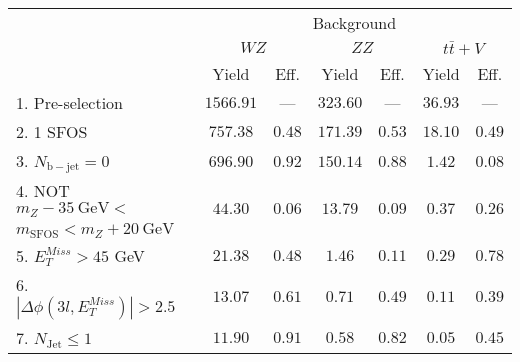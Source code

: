 \begin{tabular}{l||c|c||c|c||c|c}
\hline
 &       \multicolumn{6}{c}{Background}\\
 &  \multicolumn{2}{c||}{$WZ$} & \multicolumn{2}{c||}{$ZZ$} & \multicolumn{2}{c}{$t\bar{t}+V$} \\ 
 & Yield & Eff. & Yield & Eff. & Yield & Eff. \\
\hline\hline
1. Pre-selection & $1566.91$ & --- &  $323.60$ & --- &  $36.93$ & ---  \\
\hline
2. 1 SFOS &  $757.38$ &  $0.48$ &  $171.39$ &  $0.53$ &  $18.10$ &  $0.49$ \\ 
\hline
3. $N_{\mathrm{b-jet}} = 0$ &  $696.90$ &  $0.92$ &  $150.14$ &  $0.88$ &  $1.42$ &  $0.08$\\ 
\hline
4. NOT $m_Z - 35~\mathrm{GeV} <$  &  \multirow{2}{*}{$44.30$} &  \multirow{2}{*}{$0.06$} &  \multirow{2}{*}{$13.79$} &  \multirow{2}{*}{$0.09$} &  \multirow{2}{*}{$0.37$} &  \multirow{2}{*}{$0.26$} \\ 
$ m_{\mathrm{SFOS}} < m_Z + 20~\mathrm{GeV}$ & & & &  & & \\
\hline
5. $E_{T}^{Miss} > 45$ GeV &  $21.38$ &  $0.48$ &  $1.46$ &  $0.11$ &  $0.29$ &  $0.78$ \\ 
\hline
6. $|\Delta\phi(3l,E_{T}^{Miss})| > 2.5$ &  $13.07$ &  $0.61$ &  $0.71$ &  $0.49$ &  $0.11$ &  $0.39$ \\ 
\hline
7. $N_{\mathrm{Jet}} \leq 1$ &  $11.90$ &  $0.91$ &  $0.58$ &  $0.82$ &  $0.05$ &  $0.45$ \\ 
\hline
\end{tabular}

